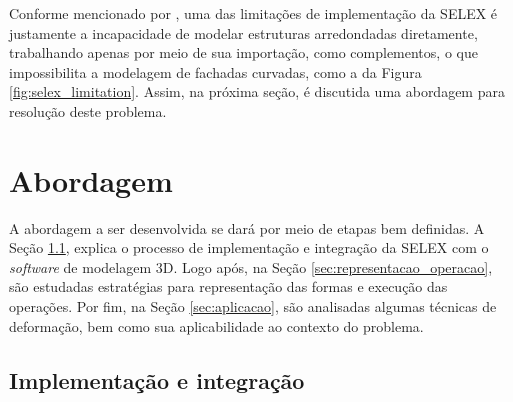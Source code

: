 Conforme mencionado por , uma das limitações de implementação da \gls{SELEX} é justamente a incapacidade de modelar estruturas arredondadas diretamente, trabalhando apenas por meio de sua importação, como complementos, o que impossibilita a modelagem de fachadas curvadas, como a da Figura \ref{fig:selex_limitation}. Assim, na próxima seção, é discutida uma abordagem para resolução deste problema.

\begin{figure}[h!]
	\centering
	\captionsetup{width=15cm}
	{}	
\end{figure}

\section{Abordagem}
\label{sec:abordagem}

A abordagem a ser desenvolvida se dará por meio de etapas bem definidas. A Seção \ref{sec:implementação}, explica o processo de implementação e integração da \gls{SELEX} com o \textit{software} de modelagem 3D. Logo após, na Seção \ref{sec:representacao_operacao}, são estudadas estratégias para representação das formas e execução das operações. Por fim, na Seção \ref{sec:aplicacao}, são analisadas algumas técnicas de deformação, bem como sua aplicabilidade ao contexto do problema.

\subsection{Implementação e integração}
\label{sec:implementação}

